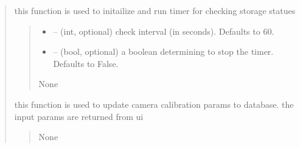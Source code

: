 \documentclass[letterpaper,10pt,english]{sphinxmanual}
\begin{document}
\begin{quote}
\begin{savenotes}
\begin{fulllineitems}
\begin{savenotes}
\begin{fulllineitems}
\end{fulllineitems}\end{savenotes}


\begin{savenotes}\begin{fulllineitems}
\label{\detokenize{setting/setting_api:oxin.setting_api.API.run_storage_check_timer}}
\pysigstartsignatures
{}
\pysigstopsignatures
\sphinxAtStartPar
this function is used to initailize and run timer for checking storage statues
\begin{quote}\begin{description}
\begin{itemize}
\item {} 
\sphinxAtStartPar
{} – (int, optional) check interval (in seconds). Defaults to 60.

\item {} 
\sphinxAtStartPar
{} – (bool, optional) a boolean determining to stop the timer. Defaults to False.

\end{itemize}

\sphinxAtStartPar
None

\end{description}\end{quote}

\end{fulllineitems}\end{savenotes}


\begin{savenotes}\begin{fulllineitems}
\label{\detokenize{setting/setting_api:oxin.setting_api.API.save_changed_calibration_params}}
\pysigstartsignatures
{}
\pysigstopsignatures
\sphinxAtStartPar
this function is used to update camera calibration params to database.
the input params are returned from ui
\begin{quote}\begin{description}
\sphinxAtStartPar
None


\end{description}
\end{quote}
\end{fulllineitems}
\end{savenotes}
\end{fulllineitems}
\end{savenotes}
\end{quote}
\end{document}

